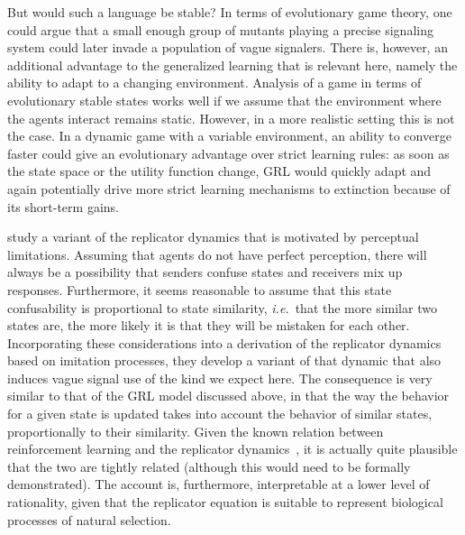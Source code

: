 \documentclass[a4paper]{article}
\begin{document}
But would such a language be stable?
In terms of evolutionary game theory, one could argue that a small enough group of mutants playing a precise signaling system could later invade a population of vague signalers.
There is, however, an additional advantage to the generalized learning that is relevant here, namely the ability to adapt to a changing environment.
Analysis of a game in terms of evolutionary stable states works well if we assume that the environment where the agents interact remains static.
However, in a more realistic setting this is not the case.
In a dynamic game with a variable environment, an ability to converge faster could give an evolutionary advantage over strict learning rules: as soon as the state space or the utility function change, GRL would quickly adapt and again potentially drive more strict learning mechanisms to extinction because of its short-term gains.


\textcite{franke_vagueness_2017} study a variant of the replicator dynamics that is motivated by perceptual limitations.
Assuming that agents do not have perfect perception, there will always be a possibility that senders confuse states and receivers mix up responses.
Furthermore, it seems reasonable to assume that this state confusability is proportional to state similarity, \emph{i.e.}~that the more similar two states are, the more likely it is that they will be mistaken for each other.
Incorporating these considerations into a derivation of the replicator dynamics based on imitation processes, they develop a variant of that dynamic that also induces vague signal use of the kind we expect here.
The consequence is very similar to that of the GRL model discussed above, in that the way the behavior for a given state is updated takes into account the behavior of similar states, proportionally to their similarity.
Given the known relation between reinforcement learning and the replicator dynamics~\parencite{Beggs2005}, it is actually quite plausible that the two are tightly related (although this would need to be formally demonstrated).
The account is, furthermore, interpretable at a lower level of rationality, given that the replicator equation is suitable to represent biological processes of natural selection.
\end{document}
